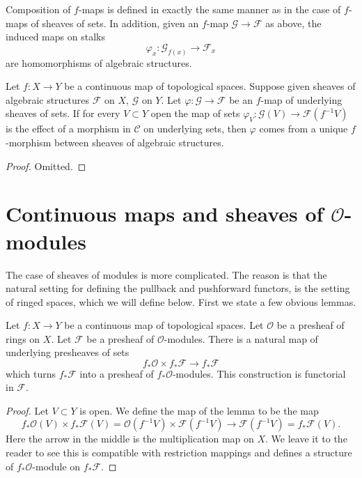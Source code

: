 \medskip\noindent
Composition of $f$-maps is defined in exactly the
same manner as in the case of $f$-maps of sheaves of
sets. In addition, given an $f$-map $\mathcal{G} \to \mathcal{F}$
as above, the induced maps on stalks
$$
\varphi_x : \mathcal{G}_{f(x)} \longrightarrow \mathcal{F}_x
$$
are homomorphisms of algebraic structures.


\begin{lemma}
\label{lemma-f-map-sets-algebraic-structures}
Let $f : X \to Y$ be a continuous map of topological spaces.
Suppose given sheaves of algebraic structures
$\mathcal{F}$ on $X$, $\mathcal{G}$ on $Y$. Let
$\varphi : \mathcal{G} \to \mathcal{F}$ be an $f$-map
of underlying sheaves of sets. If for every $V \subset Y$ open the
map of sets $\varphi_V : \mathcal{G}(V) \to \mathcal{F}(f^{-1}V)$
is the effect of a morphism in $\mathcal{C}$ on underlying sets,
then $\varphi$ comes from a unique $f$-morphism between
sheaves of algebraic structures.
\end{lemma}

\begin{proof}
Omitted.
\end{proof}




\section{Continuous maps and sheaves of $\mathcal{O}$-modules}
\label{section-presheaves-modules-functorial}

\noindent
The case of sheaves of modules is more complicated.
The reason is that the natural setting for defining
the pullback and pushforward functors, is the setting
of ringed spaces, which we will define below. First
we state a few obvious lemmas.

\begin{lemma}
\label{lemma-pushforward-presheaf-module}
Let $f : X \to Y$ be a continuous map of topological spaces.
Let $\mathcal{O}$ be a presheaf of rings on $X$. Let
$\mathcal{F}$ be a presheaf of $\mathcal{O}$-modules.
There is a natural map of underlying presheaves of sets
$$
f_*\mathcal{O} \times f_*\mathcal{F}
\longrightarrow
f_*\mathcal{F}
$$
which turns $f_*\mathcal{F}$ into a presheaf of
$f_*\mathcal{O}$-modules. This construction is
functorial in $\mathcal{F}$.
\end{lemma}

\begin{proof}
Let $V \subset Y$ is open. We define the map of the lemma
to be the map
$$
f_*\mathcal{O}(V) \times f_*\mathcal{F}(V)
=
\mathcal{O}(f^{-1}V) \times \mathcal{F}(f^{-1}V)
\to
\mathcal{F}(f^{-1}V)
=
f_*\mathcal{F}(V).
$$
Here the arrow in the middle is the multiplication map on $X$.
We leave it to the reader to see this is compatible with
restriction mappings and defines a structure of
$f_*\mathcal{O}$-module on $f_*\mathcal{F}$.
\end{proof}

